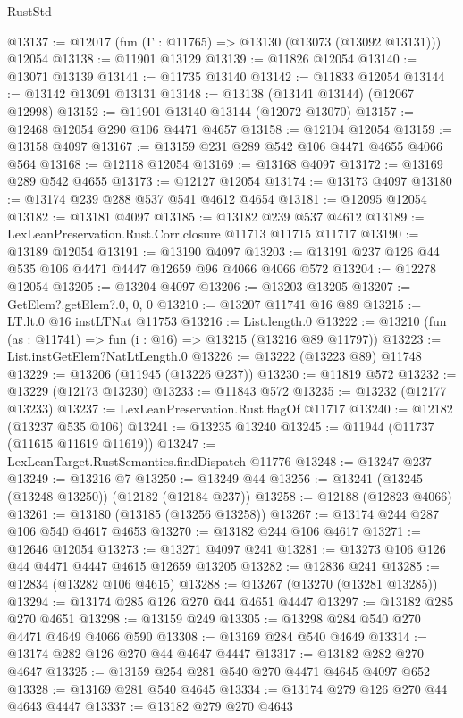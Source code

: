 \begin{lexlean}{RustStd}
\begin{coremodule}
@13137 := @12017 (fun (Γ : @11765) => @13130 (@13073 (@13092 @13131))) @12054
@13138 := @11901 @13129
@13139 := @11826 @12054
@13140 := @13071 @13139
@13141 := @11735 @13140
@13142 := @11833 @12054
@13144 := @13142 @13091 @13131
@13148 := @13138 (@13141 @13144) (@12067 @12998)
@13152 := @11901 @13140 @13144 (@12072 @13070)
@13157 := @12468 @12054 @290 @106 @4471 @4657
@13158 := @12104 @12054
@13159 := @13158 @4097
@13167 := @13159 @231 @289 @542 @106 @4471 @4655 @4066 @564
@13168 := @12118 @12054
@13169 := @13168 @4097
@13172 := @13169 @289 @542 @4655
@13173 := @12127 @12054
@13174 := @13173 @4097
@13180 := @13174 @239 @288 @537 @541 @4612 @4654
@13181 := @12095 @12054
@13182 := @13181 @4097
@13185 := @13182 @239 @537 @4612
@13189 := LexLeanPreservation.Rust.Corr.closure @11713 @11715 @11717
@13190 := @13189 @12054
@13191 := @13190 @4097
@13203 := @13191 @237 @126 @44 @535 @106 @4471 @4447 @12659 @96 @4066 @4066 @572
@13204 := @12278 @12054
@13205 := @13204 @4097
@13206 := @13203 @13205
@13207 := GetElem?.getElem?.{0, 0, 0}
@13210 := @13207 @11741 @16 @89
@13215 := LT.lt.{0} @16 instLTNat @11753
@13216 := List.length.{0}
@13222 := @13210 (fun (as : @11741) => fun (i : @16) => @13215 (@13216 @89 @11797))
@13223 := List.instGetElem?NatLtLength.{0}
@13226 := @13222 (@13223 @89) @11748
@13229 := @13206 (@11945 (@13226 @237))
@13230 := @11819 @572
@13232 := @13229 (@12173 @13230)
@13233 := @11843 @572
@13235 := @13232 (@12177 @13233)
@13237 := LexLeanPreservation.Rust.flagOf @11717
@13240 := @12182 (@13237 @535 @106)
@13241 := @13235 @13240
@13245 := @11944 (@11737 (@11615 @11619 @11619))
@13247 := LexLeanTarget.RustSemantics.findDispatch @11776
@13248 := @13247 @237
@13249 := @13216 @7
@13250 := @13249 @44
@13256 := @13241 (@13245 (@13248 @13250)) (@12182 (@12184 @237))
@13258 := @12188 (@12823 @4066)
@13261 := @13180 (@13185 (@13256 @13258))
@13267 := @13174 @244 @287 @106 @540 @4617 @4653
@13270 := @13182 @244 @106 @4617
@13271 := @12646 @12054
@13273 := @13271 @4097 @241
@13281 := @13273 @106 @126 @44 @4471 @4447 @4615 @12659 @13205
@13282 := @12836 @241
@13285 := @12834 (@13282 @106 @4615)
@13288 := @13267 (@13270 (@13281 @13285))
@13294 := @13174 @285 @126 @270 @44 @4651 @4447
@13297 := @13182 @285 @270 @4651
@13298 := @13159 @249
@13305 := @13298 @284 @540 @270 @4471 @4649 @4066 @590
@13308 := @13169 @284 @540 @4649
@13314 := @13174 @282 @126 @270 @44 @4647 @4447
@13317 := @13182 @282 @270 @4647
@13325 := @13159 @254 @281 @540 @270 @4471 @4645 @4097 @652
@13328 := @13169 @281 @540 @4645
@13334 := @13174 @279 @126 @270 @44 @4643 @4447
@13337 := @13182 @279 @270 @4643

\end{coremodule}
\end{lexlean}
